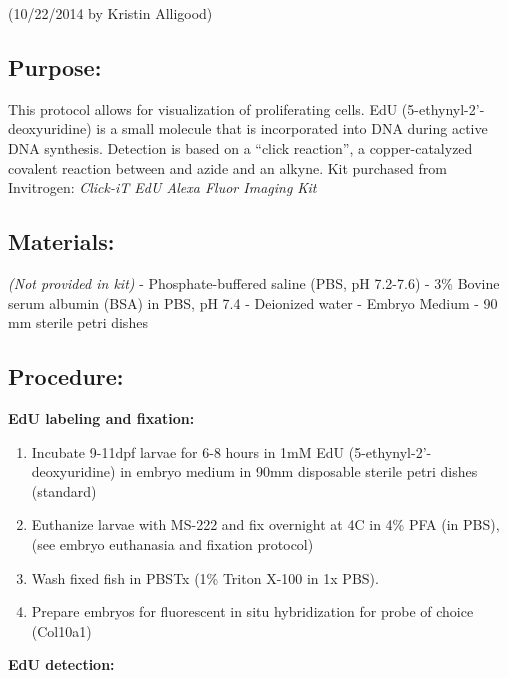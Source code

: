 \documentclass[
]{book}
\providecommand{\tightlist}{%
  \setlength{\itemsep}{0pt}\setlength{\parskip}{0pt}}
\begin{document}
(10/22/2014 by Kristin Alligood)

\hypertarget{purpose-5}{%
\subsection{Purpose:}\label{purpose-5}}

This protocol allows for visualization of proliferating cells. EdU (5-ethynyl-2'-deoxyuridine) is a small molecule that is incorporated into DNA during active DNA synthesis. Detection is based on a ``click reaction'', a copper-catalyzed covalent reaction between and azide and an alkyne. Kit purchased from Invitrogen: \emph{Click-iT EdU Alexa Fluor Imaging Kit}

\hypertarget{materials-9}{%
\subsection{Materials:}\label{materials-9}}

\emph{(Not provided in kit)}
- Phosphate-buffered saline (PBS, pH 7.2-7.6)
- 3\% Bovine serum albumin (BSA) in PBS, pH 7.4
- Deionized water
- Embryo Medium
- 90 mm sterile petri dishes

\hypertarget{procedure-13}{%
\subsection{Procedure:}\label{procedure-13}}

\textbf{EdU labeling and fixation:}

\begin{enumerate}
\def\labelenumi{\arabic{enumi}.}
\tightlist
\item
  Incubate 9-11dpf larvae for 6-8 hours in 1mM EdU (5-ethynyl-2'-deoxyuridine) in embryo medium in 90mm disposable sterile petri dishes (standard)
\item
  Euthanize larvae with MS-222 and fix overnight at 4C in 4\% PFA (in PBS), (see embryo euthanasia and fixation protocol)
\item
  Wash fixed fish in PBSTx (1\% Triton X-100 in 1x PBS).
\item
  Prepare embryos for fluorescent in situ hybridization for probe of choice (Col10a1)
\end{enumerate}

\textbf{EdU detection:}
\end{document}
